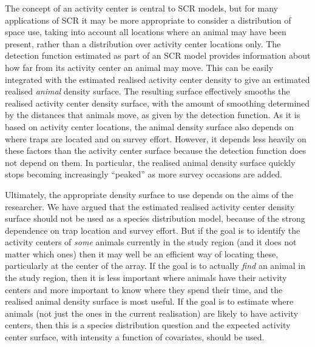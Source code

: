 \documentclass[10pt,a4paper]{article}
\begin{document}
The concept of an activity center is central to SCR models, but for many applications of SCR it may be more appropriate to consider a distribution of space use, taking into account all locations where an animal may have been present, rather than a distribution over activity center locations only. The detection function estimated as part of an SCR model provides information about how far from its activity center an animal may move. This can be easily integrated with the estimated realised activity center density to give an estimated realised {\it animal} density surface. The resulting surface effectively smooths the realised activity center density surface, with the amount of smoothing determined by the distances that animals move, as given by the detection function. As it is based on activity center locations, the animal density surface also depends on where traps are located and on survey effort. However, it depends less heavily on these factors than the activity center surface because the detection function does not depend on them. In particular, the realised animal density surface quickly stops becoming increasingly ``peaked'' as more survey occasions are added.

Ultimately, the appropriate density surface to use depends on the aims of the researcher. We have argued that the estimated realised activity center density surface should not be used as a species distribution model, because of the strong dependence on trap location and survey effort. But if the goal is to identify the activity centers of {\it some} animals currently in the study region (and it does not matter which ones) then it may well be an efficient way of locating these, particularly at the center of the array. If the goal is to actually {\it find} an animal in the study region, then it is less important where animals have their activity centers and more important to know where they spend their time, and the realised animal density surface  is most useful. If the goal is to estimate where animals (not just the ones in the current realisation) are likely to have activity centers, then this is a species distribution question and the expected activity center surface, with intensity a function of covariates, should be used.
\end{document}
